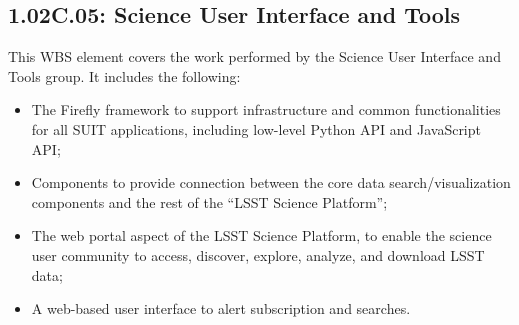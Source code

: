 \subsection{1.02C.05: Science User Interface and Tools}

This WBS element covers the work performed by the Science User Interface and
Tools group. It includes the following:

\begin{itemize}

  \item{The Firefly framework to support infrastructure and common functionalities for all SUIT applications, including low-level Python API and JavaScript API;}
  \item{Components to provide connection between the core data search/visualization components and the rest of the ``LSST Science Platform'';}
  \item{The web portal aspect of the LSST Science Platform, to enable the science user community to access, discover, explore, analyze, and download LSST data;}
  \item{A web-based user interface to alert subscription and searches.}

\end{itemize}
